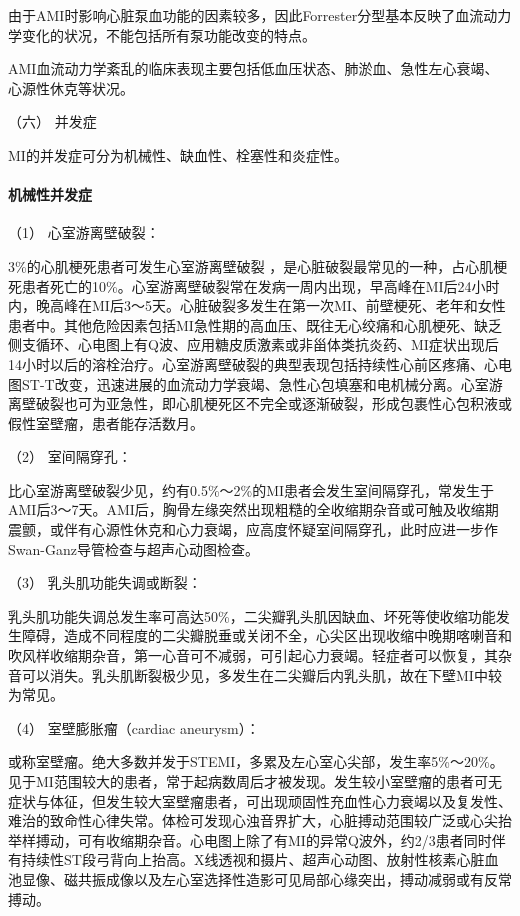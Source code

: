 由于AMI时影响心脏泵血功能的因素较多，因此Forrester分型基本反映了血流动力学变化的状况，不能包括所有泵功能改变的特点。

AMI血流动力学紊乱的临床表现主要包括低血压状态、肺淤血、急性左心衰竭、心源性休克等状况。

\hypertarget{text00312.htmlux5cux23CHP10-8-2-2-1-6}{}
（六） 并发症

MI的并发症可分为机械性、缺血性、栓塞性和炎症性。

\paragraph{机械性并发症}

\hypertarget{text00312.htmlux5cux23CHP10-8-2-2-1-6-1-1}{}
（1） 心室游离壁破裂：

3\%的心肌梗死患者可发生心室游离壁破裂
，是心脏破裂最常见的一种，占心肌梗死患者死亡的10\%。心室游离壁破裂常在发病一周内出现，早高峰在MI后24小时内，晚高峰在MI后3～5天。心脏破裂多发生在第一次MI、前壁梗死、老年和女性患者中。其他危险因素包括MI急性期的高血压、既往无心绞痛和心肌梗死、缺乏侧支循环、心电图上有Q波、应用糖皮质激素或非甾体类抗炎药、MI症状出现后14小时以后的溶栓治疗。心室游离壁破裂的典型表现包括持续性心前区疼痛、心电图ST-T改变，迅速进展的血流动力学衰竭、急性心包填塞和电机械分离。心室游离壁破裂也可为亚急性，即心肌梗死区不完全或逐渐破裂，形成包裹性心包积液或假性室壁瘤，患者能存活数月。

\hypertarget{text00312.htmlux5cux23CHP10-8-2-2-1-6-1-2}{}
（2） 室间隔穿孔：

比心室游离壁破裂少见，约有0.5\%～2\%的MI患者会发生室间隔穿孔，常发生于AMI后3～7天。AMI后，胸骨左缘突然出现粗糙的全收缩期杂音或可触及收缩期震颤，或伴有心源性休克和心力衰竭，应高度怀疑室间隔穿孔，此时应进一步作Swan-Ganz导管检查与超声心动图检查。

\hypertarget{text00312.htmlux5cux23CHP10-8-2-2-1-6-1-3}{}
（3） 乳头肌功能失调或断裂：

乳头肌功能失调总发生率可高达50\%，二尖瓣乳头肌因缺血、坏死等使收缩功能发生障碍，造成不同程度的二尖瓣脱垂或关闭不全，心尖区出现收缩中晚期喀喇音和吹风样收缩期杂音，第一心音可不减弱，可引起心力衰竭。轻症者可以恢复，其杂音可以消失。乳头肌断裂极少见，多发生在二尖瓣后内乳头肌，故在下壁MI中较为常见。

\hypertarget{text00312.htmlux5cux23CHP10-8-2-2-1-6-1-4}{}
（4） 室壁膨胀瘤（cardiac aneurysm）：

或称室壁瘤。绝大多数并发于STEMI，多累及左心室心尖部，发生率5\%～20\%。见于MI范围较大的患者，常于起病数周后才被发现。发生较小室壁瘤的患者可无症状与体征，但发生较大室壁瘤患者，可出现顽固性充血性心力衰竭以及复发性、难治的致命性心律失常。体检可发现心浊音界扩大，心脏搏动范围较广泛或心尖抬举样搏动，可有收缩期杂音。心电图上除了有MI的异常Q波外，约2/3患者同时伴有持续性ST段弓背向上抬高。X线透视和摄片、超声心动图、放射性核素心脏血池显像、磁共振成像以及左心室选择性造影可见局部心缘突出，搏动减弱或有反常搏动。

